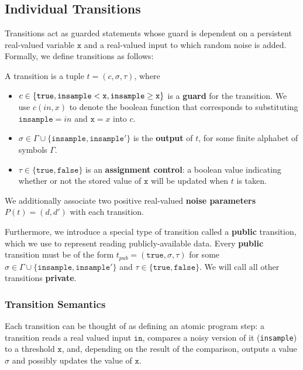 
\subsection{Individual Transitions}

Transitions act as guarded statements whose guard is dependent on a persistent real-valued variable $\texttt{x}$ and a real-valued input to which random noise is added. Formally, we define transitions as follows: 

\begin{defn}[Transitions]\label{svTransDef}
    A transition is a tuple $t = (c, \sigma, \tau)$, where \begin{itemize}
        \item $c\in \{\texttt{true}, \lguard[\texttt{x}], \gguard[\texttt{x}]\}$ is a \textbf{guard} for the transition. We use $c(in, x)$ to denote the boolean function that corresponds to substituting $\texttt{insample} = in$ and $\texttt{x} =x $ into $c$.
        \item $\sigma \in \Gamma\cup\{\texttt{insample}, \texttt{insample}'\}$ is the \textbf{output} of $t$, for some finite alphabet of symbols $\Gamma$.
        \item $\tau\in\{\texttt{true}, \texttt{false}\}$ is an \textbf{assignment control}: a boolean value indicating whether or not the stored value of $\texttt{x}$ will be updated when $t$ is taken.
    \end{itemize}
\end{defn}

We additionally associate two positive real-valued \textbf{noise parameters} $P(t) = (d, d')$ with each transition. 

Furthermore, we introduce a special type of transition called a \textbf{public} transition, which we use to represent reading publicly-available data. Every \textbf{public} transition must be of the form $t_{pub}= (\texttt{true}, \sigma, \tau)$ for some $\sigma \in \Gamma\cup\{\texttt{insample}, \texttt{insample}'\}$ and $\tau \in \{\texttt{true}, \texttt{false}\}$. We will call all other transitions \textbf{private}. 

\subsubsection{Transition Semantics}

Each transition can be thought of as defining an atomic program step: a transition reads a real valued input $\texttt{in}$, compares a noisy version of it (\texttt{insample}) to a threshold $\texttt{x}$, and, depending on the result of the comparison, outputs a value $\sigma$ and possibly updates the value of $\texttt{x}$.

